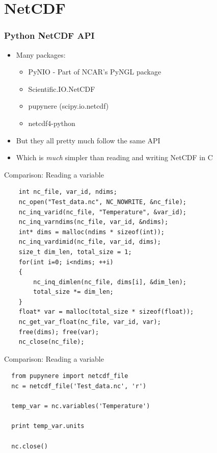 \documentclass[red, hyperref={pdfpagelabels=false}]{beamer}
\begin{document}
\section{NetCDF}
\begin{frame}
  \frametitle{Python NetCDF API}
  \begin{itemize}
    \item<1-> Many packages:
    \begin{itemize}
      \item PyNIO - Part of NCAR's PyNGL package
      \item Scientific.IO.NetCDF
      \item \alert<4> {pupynere (scipy.io.netcdf)}
      \item netcdf4-python
    \end{itemize}
    \item<2-> But they all pretty much follow the same API
    \item<3-> Which is \emph{much} simpler than reading and writing NetCDF in C
  \end{itemize}
\end{frame}

\begin{frame}[fragile]{Comparison: Reading a variable}
  \lstset{language=C}
  \begin{lstlisting}
    int nc_file, var_id, ndims;
    nc_open("Test_data.nc", NC_NOWRITE, &nc_file);
    nc_inq_varid(nc_file, "Temperature", &var_id);
    nc_inq_varndims(nc_file, var_id, &ndims);
    int* dims = malloc(ndims * sizeof(int));
    nc_inq_vardimid(nc_file, var_id, dims);
    size_t dim_len, total_size = 1;
    for(int i=0; i<ndims; ++i)
    {
        nc_inq_dimlen(nc_file, dims[i], &dim_len);
        total_size *= dim_len;
    }
    float* var = malloc(total_size * sizeof(float));
    nc_get_var_float(nc_file, var_id, var);
    free(dims); free(var);
    nc_close(nc_file);
  \end{lstlisting}
\end{frame}

\begin{frame}[fragile]{Comparison: Reading a variable}
  \lstset{language=Python}
  \begin{lstlisting}
  from pupynere import netcdf_file
  nc = netcdf_file('Test_data.nc', 'r')

  temp_var = nc.variables('Temperature')

  print temp_var.units

  nc.close()
  \end{lstlisting}
\end{frame}
\end{document}

